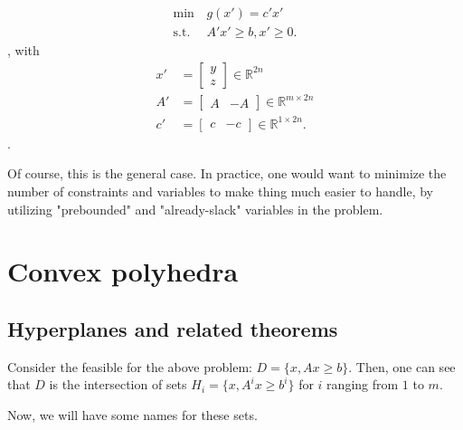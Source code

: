 \begin{align*}
  \min\,&g(x') = c'x'\\
  \text{s.t.}\,& A'x' \ge  b, x' \ge  0
.\end{align*}, with 
\begin{align*}
  x' &= \begin{bmatrix} y \\ z \end{bmatrix} \in \mathbb{R}^{2n}\\
  A' & = \begin{bmatrix} A & -A \end{bmatrix} \in \mathbb{R}^{m \times  2n}\\
  c' &= \begin{bmatrix} c & -c \end{bmatrix} \in \mathbb{R}^{1 \times  2n} 
.\end{align*}.

Of course, this is the general case. In practice, one would want to minimize the
number of constraints and variables to make thing much easier to handle, by
utilizing "prebounded" and "already-slack" variables in the problem.

\section{Convex polyhedra} %
\label{sec:Convex polyhedra}

\subsection{Hyperplanes and related theorems} %
\label{sub:Hyperplanes and related theorems}

Consider the feasible for the above problem: \( D = \{x, Ax\ge b\}   \). Then,
one can see that \( D \) is the intersection of sets \( H_{i}=\{x, A^{i}x \ge
b^{i}\}   \) for \( i \) ranging from \( 1 \) to \( m \).

Now, we will have some names for these sets.

